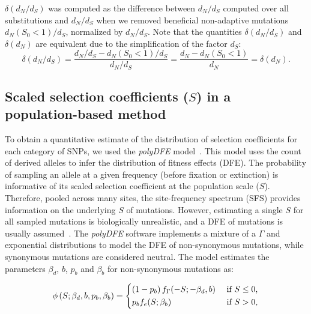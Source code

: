 \documentclass{article}
\newcommand{\dn}{d_N}
\newcommand{\ds}{d_S}
\newcommand{\dnds}{\dn / \ds}
\newcommand{\Sphy}{S_{0}}
\newcommand{\Spop}{S}
\newcommand{\AdvMean}{\beta_b}
\newcommand{\DelMean}{\beta_d}
\begin{document}
    $\delta(\dnds)$ was computed as the difference between $\dnds$ computed over all substitutions and $\dnds$ when we removed beneficial non-adaptive mutations $\dn (\Sphy < 1) / \ds$, normalized by $\dnds$.
    Note that the quantities $\delta(\dnds)$ and $\delta(\dn)$ are equivalent due to the simplification of the factor $\ds$:
    \begin{equation}
        \delta(\dnds) = \dfrac{\dnds - \dn(\Sphy < 1) / \ds}{\dnds} = \dfrac{\dn - \dn(\Sphy < 1)}{\dn} = \delta(\dn).\label{eq:delta-dnds}
    \end{equation}

    \subsection{Scaled selection coefficients ($\Spop$) in a population-based method}
    \label{subsec:s-polymorphism-method}

    To obtain a quantitative estimate of the distribution of selection coefficients for each category of SNPs, we used the \textit{polyDFE} model~\cite{tataru_inference_2017, tataru_polydfe_2020}.
    This model uses the count of derived alleles to infer the distribution of fitness effects (DFE).
    The probability of sampling an allele at a given frequency (before fixation or extinction) is informative of its scaled selection coefficient at the population scale ($\Spop$).
    Therefore, pooled across many sites, the site-frequency spectrum (SFS) provides information on the underlying $\Spop$ of mutations.
    However, estimating a single $\Spop$ for all sampled mutations is biologically unrealistic, and a DFE of mutations is usually assumed~\cite{eyre-walker_distribution_2006, eyre-walker_estimating_2009}.
    The \textit{polyDFE}\cite{tataru_inference_2017, tataru_polydfe_2020} software implements a mixture of a $\Gamma$ and exponential distributions to model the DFE of non-synonymous mutations, while synonymous mutations are considered neutral.
    The model estimates the parameters $\DelMean$, $b$, $p_b$ and $\AdvMean$ for non-synonymous mutations as:

    \begin{equation}
        \label{eq:parametric-dfe}
        \phi \left( \Spop; \DelMean , b, p_b, \AdvMean \right) =
        \begin{dcases}
            \left( 1 - p_b \right) f_{\Gamma}(-\Spop; -\DelMean, b) & \text{ if $\Spop \leq 0$,} \\
            p_b f_{e}(\Spop; \AdvMean) & \text{ if $\Spop > 0$,} \\
        \end{dcases}
    \end{equation}
\end{document}

